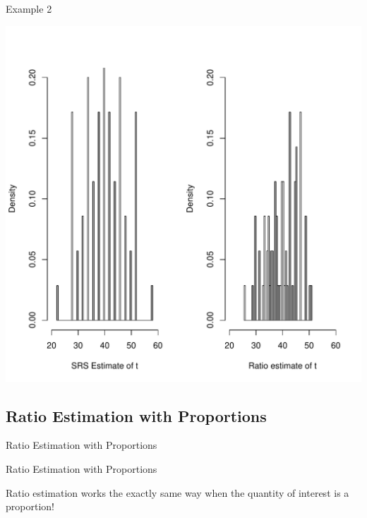 \documentclass[10pt]{beamer}\usepackage[]{graphicx}\usepackage[]{xcolor}
\newenvironment{knitrout}{}{} %
\begin{document}
\begin{frame}[containsverbatim]{Example 2}
\small
\begin{center}

\begin{knitrout}
\color{fgcolor}

{\centering \includegraphics[width=.7\linewidth]{figure/unnamed-chunk-25-1} 

}


\end{knitrout}
\end{center}
\end{frame}


\subsection{Ratio Estimation with Proportions}
\begin{frame}{}
\begin{block}{}
\begin{center}
Ratio Estimation with Proportions
\end{center}
\end{block}
\end{frame}

\begin{frame}{Ratio Estimation with Proportions}
\begin{block}{}
Ratio estimation works the exactly same way when the quantity of interest is a proportion!
\end{block}
\end{frame}
\end{document}
